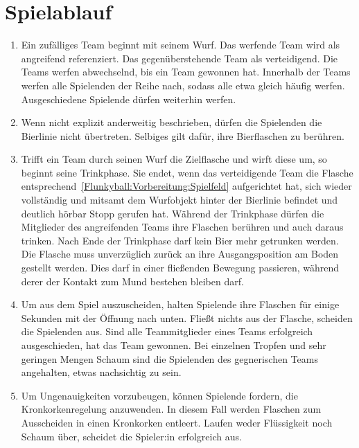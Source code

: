 \section{Spielablauf}
\begin{enumerate}[label={(\arabic*)}]    
    \item
    Ein zufälliges Team beginnt mit seinem Wurf.
    Das werfende Team wird als \glqq{}angreifend\grqq{} referenziert.
    Das gegenüberstehende Team als \glqq{}verteidigend\grqq{}.
    Die Teams werfen abwechselnd, bis ein Team gewonnen hat.
    Innerhalb der Teams werfen alle Spielenden der Reihe nach, sodass alle etwa gleich häufig werfen.
    Ausgeschiedene Spielende dürfen weiterhin werfen.

    \item
    Wenn nicht explizit anderweitig beschrieben, dürfen die Spielenden die Bierlinie nicht übertreten.
    Selbiges gilt dafür, ihre Bierflaschen zu berühren.

    \item
    Trifft ein Team durch seinen Wurf die Zielflasche und wirft diese um, so beginnt seine Trinkphase.
    Sie endet, wenn das verteidigende Team die Flasche entsprechend~\ref{Flunkyball:Vorbereitung:Spielfeld} aufgerichtet hat, sich wieder vollständig und mitsamt dem Wurfobjekt hinter der Bierlinie befindet und deutlich hörbar \glqq{}Stopp\grqq{} gerufen hat.
    Während der Trinkphase dürfen die Mitglieder des angreifenden Teams ihre Flaschen berühren und auch daraus trinken.
    Nach Ende der Trinkphase darf kein Bier mehr getrunken werden.
    Die Flasche muss unverzüglich zurück an ihre Ausgangsposition am Boden gestellt werden.
    Dies darf in einer fließenden Bewegung passieren, während derer der Kontakt zum Mund bestehen bleiben darf.

    \item
    Um aus dem Spiel auszuscheiden, halten Spielende ihre Flaschen für einige Sekunden mit der Öffnung nach unten.
    Fließt nichts aus der Flasche, scheiden die Spielenden aus.
    Sind alle Teammitglieder eines Teams erfolgreich ausgeschieden, hat das Team gewonnen.
    Bei einzelnen Tropfen und sehr geringen Mengen Schaum sind die Spielenden des gegnerischen Teams angehalten, etwas nachsichtig zu sein.

    \item
    Um Ungenauigkeiten vorzubeugen, können Spielende fordern, die Kronkorkenregelung anzuwenden.
    In diesem Fall werden Flaschen zum Ausscheiden in einen Kronkorken entleert.
    Laufen weder Flüssigkeit noch Schaum über, scheidet die Spieler:in erfolgreich aus.
\end{enumerate}


